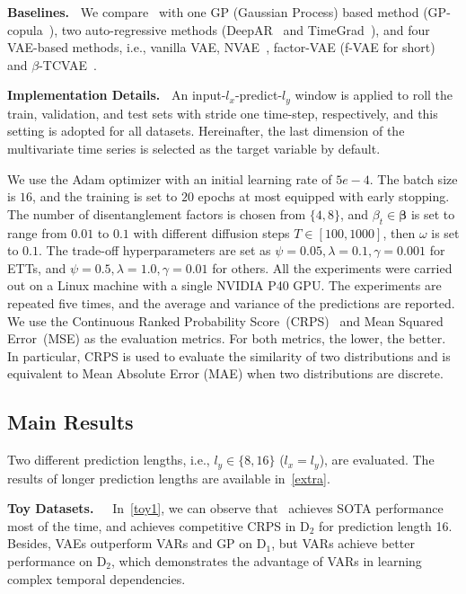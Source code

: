 \textbf{Baselines.~}
We compare \ourmodel ~with one GP (Gaussian Process) based method 
(GP-copula~\cite{salinas2019high}), two auto-regressive methods (DeepAR~\cite{salinas2020deepar} and TimeGrad~\cite{rasul2021autoregressive}), 
and four VAE-based methods, i.e., vanilla VAE, NVAE~\cite{vahdat2020nvae}, factor-VAE (f-VAE for short)~\cite{kim2018disentangling} and $\beta$-TCVAE~\cite{chen2018isolating}.

\textbf{Implementation Details.~}%
An input-$l_x$-predict-$l_y$ window is applied to roll the train, validation, and test sets with stride one time-step, respectively, and this setting is adopted for all datasets. 
Hereinafter, the last dimension of the multivariate time series is selected as the target variable by default.

We use the Adam optimizer with an initial learning rate of $5e-4$.
The batch size is $16$, and the training is set to $20$ epochs at most equipped with early stopping. 
The number of disentanglement factors is chosen from $\{4, 8\}$, 
and $\beta_t \in \bm{\beta} $ is set to range from $0.01$ to $0.1$ with different diffusion steps $T \in [100, 1000]$, 
then $\omega$ is set to $0.1$. 
The trade-off hyperparameters are set as $\psi = 0.05, \lambda=0.1, \gamma=0.001$ for ETTs, and $\psi = 0.5, \lambda=1.0, \gamma=0.01$ for others. 
All the experiments were carried out on a Linux machine with a single NVIDIA P40 GPU.
The experiments are repeated five times, and the average and variance of the predictions are reported. 
We use the Continuous Ranked Probability Score~(CRPS)~\cite{matheson1976scoring} and Mean Squared Error~(MSE) as the evaluation metrics.
For both metrics, the lower, the better. 
In particular, CRPS is used to evaluate the similarity of two distributions and is equivalent to Mean Absolute Error (MAE) when two distributions are discrete.

\subsection{Main Results} \label{e1}

Two different prediction lengths, i.e., $l_y \in \{8, 16\}$ ($l_x = l_y$), are evaluated.
The results of longer prediction lengths are available in~\cref{extra}. 

\textbf{Toy Datasets.~~}
In~\cref{toy1}, we can observe that 
\ourmodel ~achieves SOTA performance most of the time, and achieves competitive CRPS in D$_2$ for prediction length 16. 
Besides, VAEs outperform VARs and GP on D$_1$, 
but VARs achieve better performance on D$_2$, which demonstrates the advantage of VARs in learning complex temporal dependencies. 

